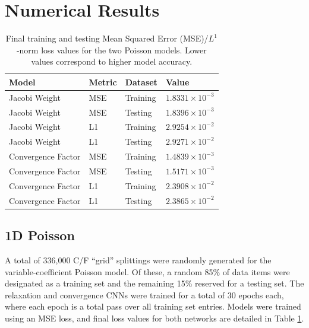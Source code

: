 \documentclass[review]{siamart190516}
\begin{document}

\section{Numerical Results}\label{sec:num}

\begin{table}[t]
\centering
\begin{tabular}{|l|l|l|l|}
\hline
Model & Metric & Dataset & Value \\

\hline
Jacobi Weight & MSE & Training & $1.8331 \times 10^{-3}$ \\
Jacobi Weight & MSE & Testing & $1.8396 \times 10^{-3}$ \\
Jacobi Weight & L1 & Training & $2.9254 \times 10^{-2}$ \\
Jacobi Weight & L1 & Testing & $2.9271 \times 10^{-2}$ \\
\hline
Convergence Factor & MSE & Training & $1.4839 \times 10^{-3}$ \\
Convergence Factor & MSE & Testing & $1.5171 \times 10^{-3}$ \\
Convergence Factor & L1 & Training & $2.3908 \times 10^{-2}$ \\
Convergence Factor & L1 & Testing & $2.3865 \times 10^{-2}$ \\
\hline
\end{tabular}
\caption{Final training and testing Mean Squared Error (MSE)/$L^1$-norm loss values for the two Poisson models.  Lower values correspond to higher model accuracy.}
\label{tab:poisson_loss}
\end{table}

\subsection{1D Poisson}

A total of 336,000 C/F ``grid'' splittings were randomly generated for the variable-coefficient Poisson model.  Of these, a random 85\% of data items were designated as a training set and the remaining 15\% reserved for a testing set.  The relaxation and convergence CNNs were trained for a total of 30 epochs each, where each epoch is a total pass over all training set entries.  Models were trained using an MSE loss, and final loss values for both networks are detailed in Table \ref{tab:poisson_loss}.
\end{document}

